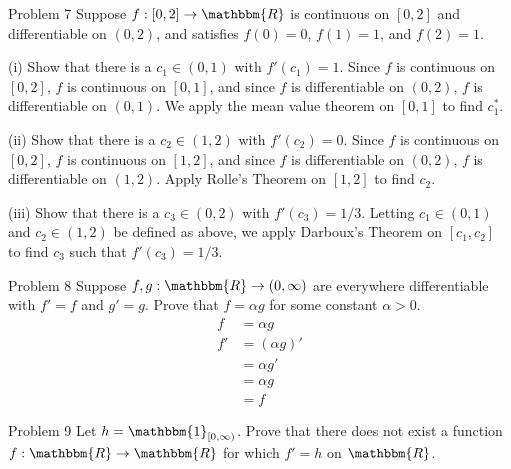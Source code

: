 \documentclass[8pt]{extarticle}
\newcommand{\R}{\mathbbm{R}}
\begin{document}
  \begin{problem}{Problem 7}
    Suppose $f: [0,2]\rightarrow \R$ is continuous on $[0,2]$ and differentiable on $(0,2)$, and satisfies $f(0) = 0$, $f(1) = 1$, and $f(2) = 1$.
    \tcblower
    \begin{problem}{(i)}
      Show that there is a $c_1\in (0,1)$ with $f'(c_1) = 1$.
      \tcblower
      Since $f$ is continuous on $[0,2]$, $f$ is continuous on $[0,1]$, and since $f$ is differentiable on $(0,2)$, $f$ is differentiable on $(0,1)$. We apply the mean value theorem on $[0,1]$ to find $c_1^{\ast}$. 
    \end{problem}
    \begin{problem}{(ii)}
      Show that there is a $c_2\in (1,2)$ with $f'(c_2) = 0$.
      \tcblower
      Since $f$ is continuous on $[0,2]$, $f$ is continuous on $[1,2]$, and since $f$ is differentiable on $(0,2)$, $f$ is differentiable on $(1,2)$. Apply Rolle's Theorem on $[1,2]$ to find $c_2$.
    \end{problem}
    \begin{problem}{(iii)}
      Show that there is a $c_3\in (0,2)$ with $f'(c_3) = 1/3$.
      \tcblower
      Letting $c_1\in (0,1)$ and $c_2\in (1,2)$ be defined as above, we apply Darboux's Theorem on $[c_1,c_2]$ to find $c_3$ such that $f'(c_3) = 1/3$.
    \end{problem}
  \end{problem}
  \begin{problem}{Problem 8}
    Suppose $f,g: \R\rightarrow (0,\infty)$ are everywhere differentiable with $f' = f$ and $g' = g$. Prove that $f = \alpha g$ for some constant $\alpha > 0$.
    \tcblower
    \begin{align*}
      f &= \alpha g\\
      f' &= (\alpha g)'\\
         &= \alpha g'\\
         &= \alpha g\\
         &= f
    \end{align*}
  \end{problem}
  \begin{problem}{Problem 9}
    Let $h = \mathbbm{1}_{[0,\infty)}$. Prove that there does not exist a function $f: \R\rightarrow\R$ for which $f' = h$ on $\R$.
  \end{problem}
\end{document}
